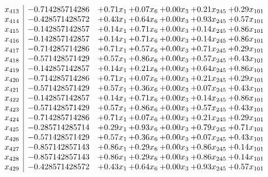 \documentclass[8pt]{article}
\begin{document}
\[\begin{array}{c| c c@{\hskip 2pt} c@{\hskip 2pt} c@{\hskip 2pt} c@{\hskip 2pt} c@{\hskip 2pt} }
 x_{413}   &  -0.714285714286 & +  0.71 x_{1} & +  0.07 x_{6} & +  0.00 x_{3} & +  0.21 x_{245} & +  0.29 x_{101}\\
 x_{414}   &  -0.428571428572 & +  0.43 x_{1} & +  0.64 x_{6} & +  0.00 x_{3} & +  0.93 x_{245} & +  0.57 x_{101}\\
 x_{415}   &  -0.142857142857 & +  0.14 x_{1} & +  0.71 x_{6} & +  0.00 x_{3} & +  0.14 x_{245} & +  0.86 x_{101}\\
 x_{416}   &  -0.142857142857 & +  0.14 x_{1} & +  0.71 x_{6} & +  0.00 x_{3} & +  0.14 x_{245} & +  0.86 x_{101}\\
 x_{417}   &  -0.714285714286 & +  0.71 x_{1} & +  0.57 x_{6} & +  0.00 x_{3} & +  0.71 x_{245} & +  0.29 x_{101}\\
 x_{418}   &  -0.571428571429 & +  0.57 x_{1} & +  0.86 x_{6} & +  0.00 x_{3} & +  0.57 x_{245} & +  0.43 x_{101}\\
 x_{419}   &  -0.142857142857 & +  0.14 x_{1} & +  0.21 x_{6} & +  0.00 x_{3} & +  0.64 x_{245} & +  0.86 x_{101}\\
 x_{420}   &  -0.714285714286 & +  0.71 x_{1} & +  0.07 x_{6} & +  0.00 x_{3} & +  0.21 x_{245} & +  0.29 x_{101}\\
 x_{421}   &  -0.571428571429 & +  0.57 x_{1} & +  0.36 x_{6} & +  0.00 x_{3} & +  0.07 x_{245} & +  0.43 x_{101}\\
 x_{422}   &  -0.142857142857 & +  0.14 x_{1} & +  0.71 x_{6} & +  0.00 x_{3} & +  0.14 x_{245} & +  0.86 x_{101}\\
 x_{423}   &  -0.571428571429 & +  0.57 x_{1} & +  0.86 x_{6} & +  0.00 x_{3} & +  0.57 x_{245} & +  0.43 x_{101}\\
 x_{424}   &  -0.714285714286 & +  0.71 x_{1} & +  0.07 x_{6} & +  0.00 x_{3} & +  0.21 x_{245} & +  0.29 x_{101}\\
 x_{425}   &  -0.285714285714 & +  0.29 x_{1} & +  0.93 x_{6} & +  0.00 x_{3} & +  0.79 x_{245} & +  0.71 x_{101}\\
 x_{426}   &  -0.571428571429 & +  0.57 x_{1} & +  0.36 x_{6} & +  0.00 x_{3} & +  0.07 x_{245} & +  0.43 x_{101}\\
 x_{427}   &  -0.857142857143 & +  0.86 x_{1} & +  0.29 x_{6} & +  0.00 x_{3} & +  0.86 x_{245} & +  0.14 x_{101}\\
 x_{428}   &  -0.857142857143 & +  0.86 x_{1} & +  0.29 x_{6} & +  0.00 x_{3} & +  0.86 x_{245} & +  0.14 x_{101}\\
 x_{429}   &  -0.428571428572 & +  0.43 x_{1} & +  0.64 x_{6} & +  0.00 x_{3} & +  0.93 x_{245} & +  0.57 x_{101}\\

\end{array}\]
\end{document}
